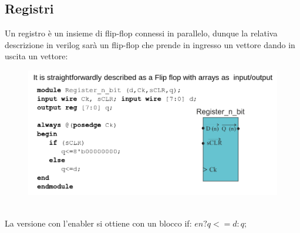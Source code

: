 \documentclass{book}
\begin{document}
        \subsection{Registri}
            Un registro è un insieme di flip-flop connessi in parallelo, dunque la relativa descrizione
            in verilog sarà un flip-flop che prende in ingresso un vettore dando in uscita un vettore:
            \begin{figure}[h!]
                \begin{center}
                    \includegraphics[width=0.75\linewidth]{img/chapt11img11.png}
                \end{center}
            \end{figure} \\
            La versione con l'enabler si ottiene con un blocco if: $en ? q<=d : q ;$
            \newpage
\end{document}

